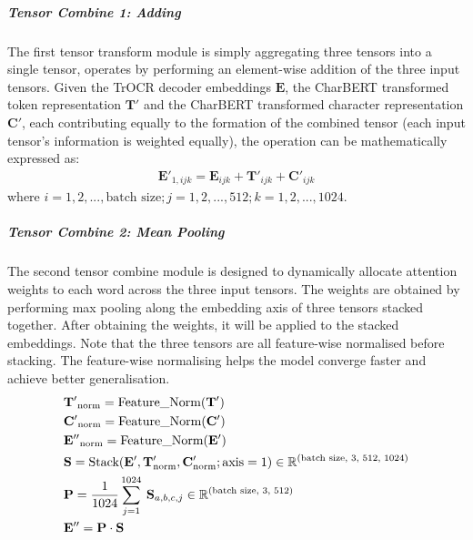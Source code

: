 \subparagraph*{Tensor Combine 1: Adding}
\label{subpar:3_adding}
The first tensor transform module is simply aggregating three tensors into a single tensor, operates by performing an element-wise addition of the three input tensors. Given the TrOCR decoder embeddings $\mathbf{E}$, the CharBERT transformed token representation $\mathbf{T'}$ and the CharBERT transformed character representation $\mathbf{C'}$, each contributing equally to the formation of the combined tensor (each input tensor's information is weighted equally), the operation can be mathematically expressed as:
\begin{equation} \label{eq:3_tensor_combine_adding}
    \begin{split}
        \mathbf{E}'_{1, ijk} = \mathbf{E}_{ijk} + \mathbf{T}'_{ijk} + \mathbf{C}'_{ijk}
    \end{split}
\end{equation}
where $i = 1, 2, ..., \text{batch size}; j = 1, 2, ..., 512; k = 1, 2, ..., 1024$.
\subparagraph*{Tensor Combine 2: Mean Pooling}
\label{subpar:3_mean_pooling}
The second tensor combine module is designed to dynamically allocate attention weights to each word across the three input tensors. The weights are obtained by performing max pooling along the embedding axis of three tensors stacked together. After obtaining the weights, it will be applied to the stacked embeddings. Note that the three tensors are all feature-wise normalised before stacking. The feature-wise normalising helps the model converge faster and achieve better generalisation. 
\begin{equation} \label{eq:3_tensor_combine_linear_1}
    \begin{split}
        &\mathbf{T'}_{\text{norm}} = \text{Feature\_Norm}(\mathbf{T}')\\
        &\mathbf{C'}_{\text{norm}} = \text{Feature\_Norm}(\mathbf{C}')\\
        &\mathbf{E''}_{\text{norm}} = \text{Feature\_Norm}(\mathbf{E}')\\
        &\mathbf{S} = \text{Stack}(\mathbf{E}', \mathbf{T}'_{\text{norm}}, \mathbf{C}'_{\text{norm}}; \text{axis} = 1)\in \mathbb{R}^{{\small(\text{batch size, 3, 512, 1024})}}\\
        &\mathbf{P} = \frac{1}{1024}\sum_{j = 1}^{1024}\:\mathbf{S}_{a,b,c,j}\in \mathbb{R}^{{\small(\text{batch size, 3, 512})}}\\
        &\mathbf{E}'' = \mathbf{P}\cdot \mathbf{S}
    \end{split}
\end{equation}
